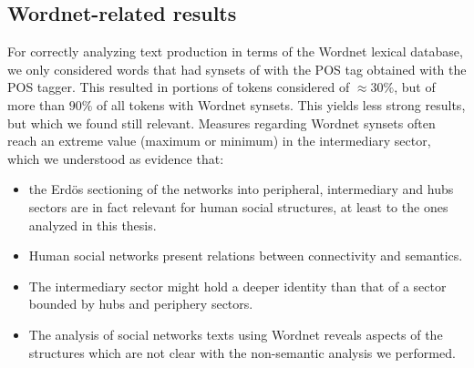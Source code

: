 																																												\subsection{Wordnet-related results}
																																												For correctly analyzing text production in terms of the Wordnet lexical database,
																																												we only considered words that had synsets of with the POS tag obtained with the POS tagger.
																																												This resulted in portions of tokens considered of $\approx 30\%$,
																																												but of more than $90\%$ of all tokens with Wordnet synsets.
																																												This yields less strong results, but which we found still relevant.
																																												Measures regarding Wordnet synsets often reach an extreme value (maximum or minimum)
																																												in the intermediary sector, which we understood as evidence that:
																																												\begin{itemize}
																																													\item the Erd\"os sectioning of the networks into peripheral, intermediary and hubs sectors are in fact relevant for human social structures, at least to the ones analyzed in this thesis.
																																														\item Human social networks present relations between connectivity and semantics.
																																															\item The intermediary sector might hold a deeper identity than that of a sector bounded by hubs and periphery sectors.
																																																\item The analysis of social networks texts using Wordnet reveals aspects of the structures which are not clear with the non-semantic analysis we performed.
																																																\end{itemize}

